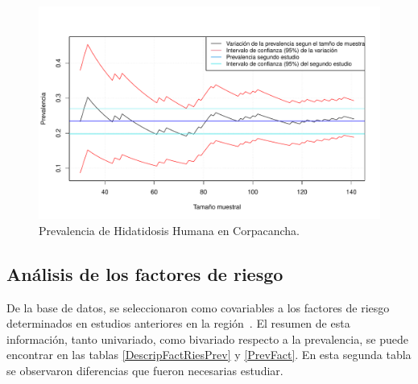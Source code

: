 \newpage

\begin{figure}[h]\label{prevalence_samplesize}
	\begin{center}
		\includegraphics[width=1\textwidth]{graficos/prevalence_samplesize.pdf}
	\end{center}
	\caption{Prevalencia de Hidatidosis Humana en Corpacancha.}
\end{figure}

\newpage

\subsection{Análisis de los factores de riesgo}
De la base de datos, se seleccionaron como covariables a los factores de riesgo determinados en estudios anteriores en la región~\cite{santivanez2010factores}. El resumen de esta información, tanto univariado, como bivariado respecto a la prevalencia, se puede encontrar en las tablas \ref{DescripFactRiesPrev} y \ref{PrevFact}. En esta segunda tabla se observaron diferencias que fueron necesarias estudiar.


